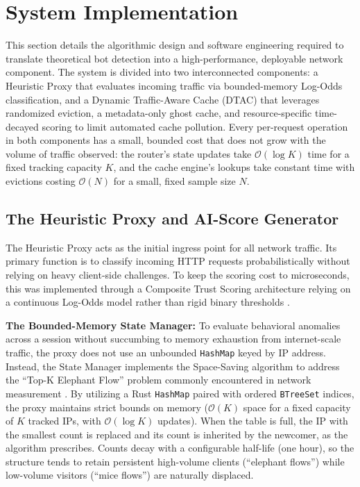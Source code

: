 \section{System Implementation}
This section details the algorithmic design and software engineering required to translate theoretical bot detection into a high-performance, deployable network component. The system is divided into two interconnected components: a Heuristic Proxy that evaluates incoming traffic via bounded-memory Log-Odds classification, and a Dynamic Traffic-Aware Cache (DTAC) that leverages randomized eviction, a metadata-only ghost cache, and resource-specific time-decayed scoring to limit automated cache pollution. Every per-request operation in both components has a small, bounded cost that does not grow with the volume of traffic observed: the router's state updates take $\mathcal{O}(\log K)$ time for a fixed tracking capacity $K$, and the cache engine's lookups take constant time with evictions costing $\mathcal{O}(N)$ for a small, fixed sample size $N$.

\subsection{The Heuristic Proxy and AI-Score Generator}
The Heuristic Proxy acts as the initial ingress point for all network traffic. Its primary function is to classify incoming HTTP requests probabilistically without relying on heavy client-side challenges. To keep the scoring cost to microseconds, this was implemented through a Composite Trust Scoring architecture relying on a continuous Log-Odds model rather than rigid binary thresholds \cite{chandra_composite_2026}.

\textbf{The Bounded-Memory State Manager:}
To evaluate behavioral anomalies across a session without succumbing to memory exhaustion from internet-scale traffic, the proxy does not use an unbounded \texttt{HashMap} keyed by IP address. Instead, the State Manager implements the Space-Saving algorithm \cite{metwally_efficient_2005} to address the ``Top-K Elephant Flow'' problem commonly encountered in network measurement \cite{gong_heavykeeper_2018}. By utilizing a Rust \texttt{HashMap} paired with ordered \texttt{BTreeSet} indices, the proxy maintains strict bounds on memory ($\mathcal{O}(K)$ space for a fixed capacity of $K$ tracked IPs, with $\mathcal{O}(\log K)$ updates). When the table is full, the IP with the smallest count is replaced and its count is inherited by the newcomer, as the algorithm prescribes. Counts decay with a configurable half-life (one hour), so the structure tends to retain persistent high-volume clients (``elephant flows'') while low-volume visitors (``mice flows'') are naturally displaced.

